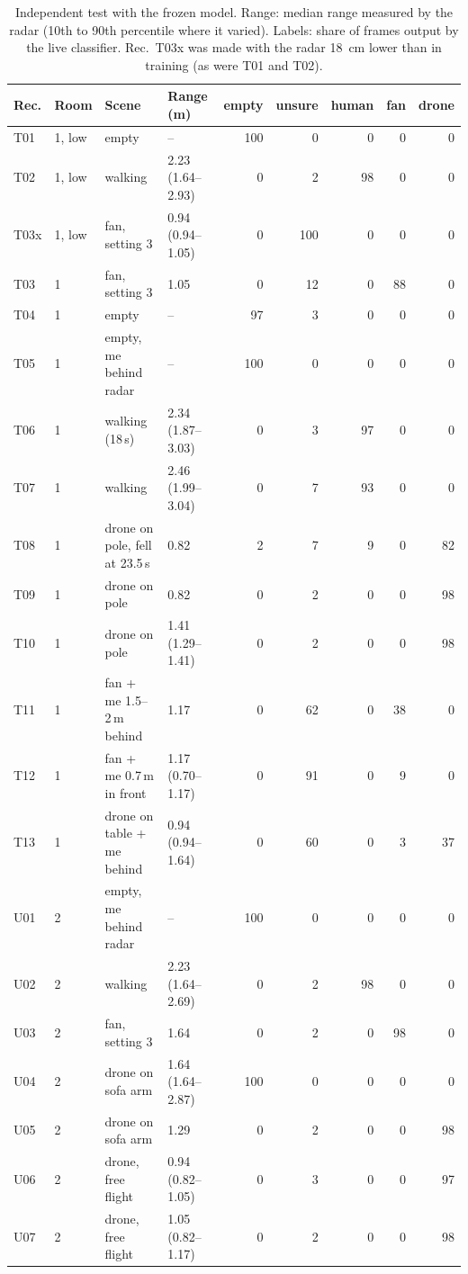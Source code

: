 \documentclass[11pt,a4paper]{article}
\begin{document}
\begin{table}[t]
\centering\scriptsize
\caption{Independent test with the frozen model. Range: median range measured by the radar (10th to 90th percentile where it varied). Labels: share of frames output by the live classifier. Rec.\ T03x was made with the radar \SI{18}{cm} lower than in training (as were T01 and T02).}
\label{tab:test}
\begin{tabular}{@{}llllrrrrr@{}}
\toprule
Rec. & Room & Scene & Range (m) & empty & unsure & human & fan & drone\\
\midrule
T01 & 1, low & empty & -- & 100 & 0 & 0 & 0 & 0\\
T02 & 1, low & walking & 2.23 (1.64--2.93) & 0 & 2 & 98 & 0 & 0\\
T03x & 1, low & fan, setting 3 & 0.94 (0.94--1.05) & 0 & 100 & 0 & 0 & 0\\
T03 & 1 & fan, setting 3 & 1.05 & 0 & 12 & 0 & 88 & 0\\
T04 & 1 & empty & -- & 97 & 3 & 0 & 0 & 0\\
T05 & 1 & empty, me behind radar & -- & 100 & 0 & 0 & 0 & 0\\
T06 & 1 & walking (18\,s) & 2.34 (1.87--3.03) & 0 & 3 & 97 & 0 & 0\\
T07 & 1 & walking & 2.46 (1.99--3.04) & 0 & 7 & 93 & 0 & 0\\
T08 & 1 & drone on pole, fell at 23.5\,s & 0.82 & 2 & 7 & 9 & 0 & 82\\
T09 & 1 & drone on pole & 0.82 & 0 & 2 & 0 & 0 & 98\\
T10 & 1 & drone on pole & 1.41 (1.29--1.41) & 0 & 2 & 0 & 0 & 98\\
T11 & 1 & fan + me 1.5--2\,m behind & 1.17 & 0 & 62 & 0 & 38 & 0\\
T12 & 1 & fan + me 0.7\,m in front & 1.17 (0.70--1.17) & 0 & 91 & 0 & 9 & 0\\
T13 & 1 & drone on table + me behind & 0.94 (0.94--1.64) & 0 & 60 & 0 & 3 & 37\\
U01 & 2 & empty, me behind radar & -- & 100 & 0 & 0 & 0 & 0\\
U02 & 2 & walking & 2.23 (1.64--2.69) & 0 & 2 & 98 & 0 & 0\\
U03 & 2 & fan, setting 3 & 1.64 & 0 & 2 & 0 & 98 & 0\\
U04 & 2 & drone on sofa arm & 1.64 (1.64--2.87) & 100 & 0 & 0 & 0 & 0\\
U05 & 2 & drone on sofa arm & 1.29 & 0 & 2 & 0 & 0 & 98\\
U06 & 2 & drone, free flight & 0.94 (0.82--1.05) & 0 & 3 & 0 & 0 & 97\\
U07 & 2 & drone, free flight & 1.05 (0.82--1.17) & 0 & 2 & 0 & 0 & 98\\
\bottomrule
\end{tabular}
\end{table}
\end{document}
